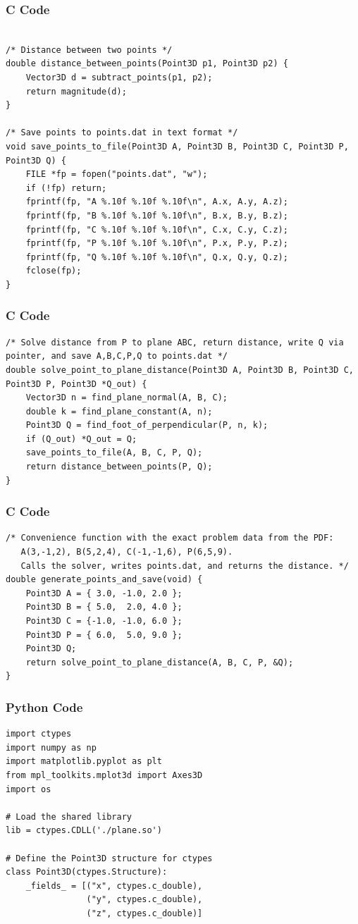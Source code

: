\documentclass{beamer}
\begin{document}
\begin{frame}[fragile]
    \frametitle{C Code}
    \begin{lstlisting}

/* Distance between two points */
double distance_between_points(Point3D p1, Point3D p2) {
    Vector3D d = subtract_points(p1, p2);
    return magnitude(d);
}

/* Save points to points.dat in text format */
void save_points_to_file(Point3D A, Point3D B, Point3D C, Point3D P, Point3D Q) {
    FILE *fp = fopen("points.dat", "w");
    if (!fp) return;
    fprintf(fp, "A %.10f %.10f %.10f\n", A.x, A.y, A.z);
    fprintf(fp, "B %.10f %.10f %.10f\n", B.x, B.y, B.z);
    fprintf(fp, "C %.10f %.10f %.10f\n", C.x, C.y, C.z);
    fprintf(fp, "P %.10f %.10f %.10f\n", P.x, P.y, P.z);
    fprintf(fp, "Q %.10f %.10f %.10f\n", Q.x, Q.y, Q.z);
    fclose(fp);
}
    \end{lstlisting}
\end{frame}

\begin{frame}[fragile]
    \frametitle{C Code}
    \begin{lstlisting}
/* Solve distance from P to plane ABC, return distance, write Q via pointer, and save A,B,C,P,Q to points.dat */
double solve_point_to_plane_distance(Point3D A, Point3D B, Point3D C, Point3D P, Point3D *Q_out) {
    Vector3D n = find_plane_normal(A, B, C);
    double k = find_plane_constant(A, n);
    Point3D Q = find_foot_of_perpendicular(P, n, k);
    if (Q_out) *Q_out = Q;
    save_points_to_file(A, B, C, P, Q);
    return distance_between_points(P, Q);
}
    \end{lstlisting}
\end{frame}

\begin{frame}[fragile]
    \frametitle{C Code}
    \begin{lstlisting}
/* Convenience function with the exact problem data from the PDF:
   A(3,-1,2), B(5,2,4), C(-1,-1,6), P(6,5,9).
   Calls the solver, writes points.dat, and returns the distance. */
double generate_points_and_save(void) {
    Point3D A = { 3.0, -1.0, 2.0 };
    Point3D B = { 5.0,  2.0, 4.0 };
    Point3D C = {-1.0, -1.0, 6.0 };
    Point3D P = { 6.0,  5.0, 9.0 };
    Point3D Q;
    return solve_point_to_plane_distance(A, B, C, P, &Q);
}
    \end{lstlisting}
\end{frame}

\begin{frame}[fragile]
    \frametitle{Python Code}
    \begin{lstlisting}
import ctypes
import numpy as np
import matplotlib.pyplot as plt
from mpl_toolkits.mplot3d import Axes3D
import os

# Load the shared library
lib = ctypes.CDLL('./plane.so')

# Define the Point3D structure for ctypes
class Point3D(ctypes.Structure):
    _fields_ = [("x", ctypes.c_double),
                ("y", ctypes.c_double), 
                ("z", ctypes.c_double)]
    \end{lstlisting}
\end{frame}
\end{document}
